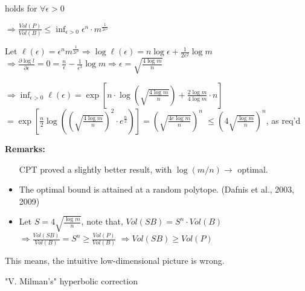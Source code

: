 \documentclass[12pt]{article}
\begin{document}
holds for $\forall \epsilon > 0$

$\Rightarrow \frac{Vol(P)}{Vol(B)} \leq \inf_{\epsilon > 0} \epsilon^n \cdot m^{\frac{1}{2\epsilon^2}}$

Let $\ell(\epsilon) = \epsilon^n m^{\frac{1}{2\epsilon^2}} \Rightarrow \log \ell(\epsilon) = n \log \epsilon + \frac{1}{2\epsilon^2} \log m$
$\Rightarrow \frac{\partial \log l}{\partial \epsilon} = 0 = \frac{n}{\epsilon} - \frac{1}{\epsilon^3} \log m \Rightarrow \epsilon = \sqrt{\frac{4 \log m}{n}}$

$\Rightarrow \inf_{\epsilon > 0} \ell(\epsilon) = \exp\left[n \cdot \log \left(\sqrt{\frac{4 \log m}{n}}\right) + \frac{2 \log m}{4 \log m} \cdot n\right]$
$= \exp\left[\frac{n}{2} \log\left(\left(\sqrt{\frac{4 \log m}{n}}\right)^2 \cdot e^{\frac{n}{2}}\right)\right] = \left(\sqrt{\frac{4e \log m}{n}}\right)^n$
$\leq \left(4\sqrt{\frac{\log m}{n}}\right)^n$, as req'd

\textbf{Remarks:}
\begin{itemize}
    \item [CPT] proved a slightly better result, with $\log(m/n) \rightarrow$ optimal.
    \item The optimal bound is attained at a random polytope. (Dafnis et al., 2003, 2009)
    \item Let $S = 4\sqrt{\frac{\log m}{n}}$, note that, $Vol(SB) = S^n \cdot Vol(B)$
    $\Rightarrow \frac{Vol(SB)}{Vol(B)} = S^n \geq \frac{Vol(P)}{Vol(B)}$
    $\Rightarrow Vol(SB) \geq Vol(P)$
\end{itemize}

This means, the intuitive low-dimensional picture is wrong.


\hspace{2cm} "V. Milman's" hyperbolic correction

\end{document}
